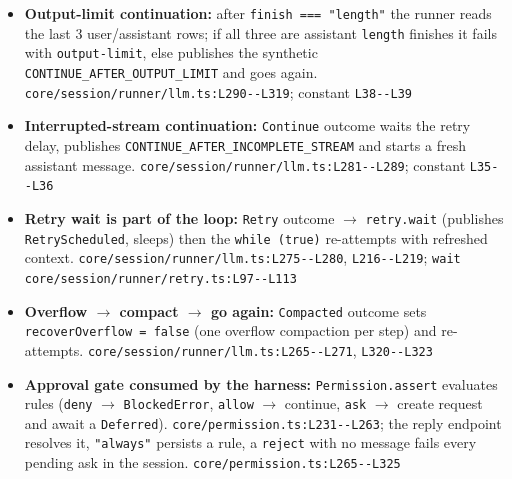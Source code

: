 \begin{itemize}
\item \textbf{Output-limit continuation:} after \texttt{finish === "length"} the runner reads the last 3 user/assistant rows; if all three are assistant \texttt{length} finishes it fails with \texttt{output-\allowbreak{}limit}, else publishes the synthetic \texttt{CONTINUE\_\allowbreak{}AFTER\_\allowbreak{}OUTPUT\_\allowbreak{}LIMIT} and goes again. \texttt{core/\allowbreak{}session/\allowbreak{}runner/\allowbreak{}llm.\allowbreak{}ts:\allowbreak{}L290-\allowbreak{}-\allowbreak{}L319}; constant \texttt{L38-\allowbreak{}-\allowbreak{}L39}
\item \textbf{Interrupted-stream continuation:} \texttt{Continue} outcome waits the retry delay, publishes \texttt{CONTINUE\_\allowbreak{}AFTER\_\allowbreak{}INCOMPLETE\_\allowbreak{}STREAM} and starts a fresh assistant message. \texttt{core/\allowbreak{}session/\allowbreak{}runner/\allowbreak{}llm.\allowbreak{}ts:\allowbreak{}L281-\allowbreak{}-\allowbreak{}L289}; constant \texttt{L35-\allowbreak{}-\allowbreak{}L36}
\item \textbf{Retry wait is part of the loop:} \texttt{Retry} outcome $\rightarrow$ \texttt{retry.\allowbreak{}wait} (publishes \texttt{RetryScheduled}, sleeps) then the \texttt{while (\allowbreak{}true)} re-attempts with refreshed context. \texttt{core/\allowbreak{}session/\allowbreak{}runner/\allowbreak{}llm.\allowbreak{}ts:\allowbreak{}L275-\allowbreak{}-\allowbreak{}L280}, \texttt{L216-\allowbreak{}-\allowbreak{}L219}; \texttt{wait} \texttt{core/\allowbreak{}session/\allowbreak{}runner/\allowbreak{}retry.\allowbreak{}ts:\allowbreak{}L97-\allowbreak{}-\allowbreak{}L113}
\item \textbf{Overflow $\rightarrow$ compact $\rightarrow$ go again:} \texttt{Compacted} outcome sets \texttt{recoverOverflow = false} (one overflow compaction per step) and re-attempts. \texttt{core/\allowbreak{}session/\allowbreak{}runner/\allowbreak{}llm.\allowbreak{}ts:\allowbreak{}L265-\allowbreak{}-\allowbreak{}L271}, \texttt{L320-\allowbreak{}-\allowbreak{}L323}
\item \textbf{Approval gate consumed by the harness:} \texttt{Permission.\allowbreak{}assert} evaluates rules (\texttt{deny} $\rightarrow$ \texttt{BlockedError}, \texttt{allow} $\rightarrow$ continue, \texttt{ask} $\rightarrow$ create request and await a \texttt{Deferred}). \texttt{core/\allowbreak{}permission.\allowbreak{}ts:\allowbreak{}L231-\allowbreak{}-\allowbreak{}L263}; the reply endpoint resolves it, \texttt{"always"} persists a rule, a \texttt{reject} with no message fails every pending ask in the session. \texttt{core/\allowbreak{}permission.\allowbreak{}ts:\allowbreak{}L265-\allowbreak{}-\allowbreak{}L325}

\end{itemize}
